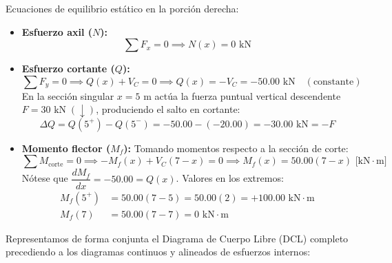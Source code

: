 Ecuaciones de equilibrio estático en la porción derecha:
\begin{itemize}
    \item \textbf{Esfuerzo axil ($N$):}
          \begin{equation}
              \sum F_x = 0 \implies \boxed{N(x) = 0\text{ kN}}
          \end{equation}

    \item \textbf{Esfuerzo cortante ($Q$):}
          \begin{equation}
              \sum F_y = 0 \implies Q(x) + V_C = 0 \implies \boxed{Q(x) = -V_C = -50.00\text{ kN}} \quad (\text{constante})
          \end{equation}
          En la sección singular $x = 5\text{ m}$ actúa la fuerza puntual vertical descendente $F = 30\text{ kN}\;(\downarrow)$, produciendo el salto en cortante:
          \begin{equation}
              \Delta Q = Q(5^+) - Q(5^-) = -50.00 - (-20.00) = -30.00\text{ kN} = -F
          \end{equation}

    \item \textbf{Momento flector ($M_f$):}
          Tomando momentos respecto a la sección de corte:
          \begin{equation}
              \sum M_{\text{corte}} = 0 \implies -M_f(x) + V_C(7 - x) = 0 \implies \boxed{M_f(x) = 50.00(7 - x)\text{ [kN}\cdot\text{m]}}
          \end{equation}
          Nótese que $\dfrac{dM_f}{dx} = -50.00 = Q(x)$.
          Valores en los extremos:
          \begin{align*}
              M_f(5^+) & = 50.00(7 - 5) = 50.00(2) = \boxed{+100.00\text{ kN}\cdot\text{m}} \\
              M_f(7)   & = 50.00(7 - 7) = \boxed{0\text{ kN}\cdot\text{m}}
          \end{align*}
\end{itemize}


Representamos de forma conjunta el Diagrama de Cuerpo Libre (DCL) completo precediendo a los diagramas continuos y alineados de esfuerzos internos:

